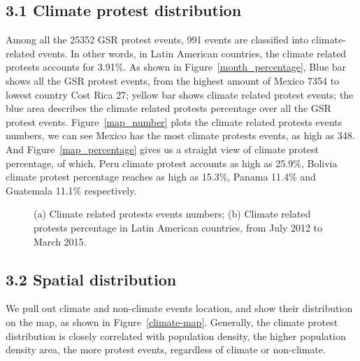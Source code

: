 \documentclass[9pt,twocolumn,twoside]{pnas-new}
\begin{document}
\subsection{3.1 Climate protest distribution}
Among all the 25352 GSR protest events,  991 events are classified into climate-related events. In other words, in Latin American countries, the climate related protests accounts for 3.91\%. As shown in Figure~\ref{month_percentage}, Blue bar shows all the GSR protest events, from the highest amount of Mexico 7354 to lowest country Cost Rica 27; yellow bar shows climate related protest events; the blue area describes the climate related protests percentage over all the GSR protest events. Figure~\ref{map_number} plots the climate related protests events numbers, we can see Mexico has the most climate protests events, as high as 348. And Figure~\ref{map_percentage} gives us a straight view of climate protest percentage, of which, Peru climate protest accounts as high as 25.9\%, Bolivia climate protest percentage reaches as high as 15.3\%, Panama 11.4\% and Guatemala 11.1\% respectively.

\begin{figure}[ht]
	\centering
	\caption{(a) Climate related protests events numbers; (b) Climate related protests percentage in Latin American countries, from July 2012 to March 2015. }
\label{map}
\end{figure}


\subsection{3.2 Spatial distribution}
We pull out climate and non-climate events location, and show their distribution on the map, as shown in Figure~\ref{climate-map}. Generally, the climate protest distribution is closely correlated with population density, the higher population density area, the more protest events, regardless of climate or non-climate.
\end{document}

